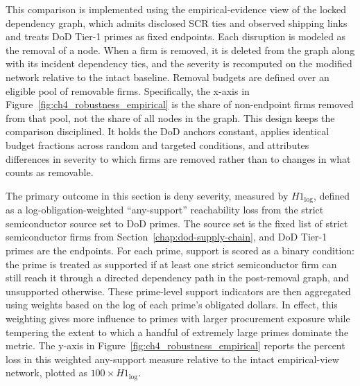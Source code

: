 This comparison is implemented using the empirical-evidence view of the locked dependency graph, which admits disclosed SCR ties and observed shipping links and treats DoD Tier-1 primes as fixed endpoints. Each disruption is modeled as the removal of a node. When a firm is removed, it is deleted from the graph along with its incident dependency ties, and the severity is recomputed on the modified network relative to the intact baseline. Removal budgets are defined over an eligible pool of removable firms. Specifically, the x-axis in Figure~\ref{fig:ch4_robustness_empirical} is the share of non-endpoint firms removed from that pool, not the share of all nodes in the graph. This design keeps the comparison disciplined. It holds the DoD anchors constant, applies identical budget fractions across random and targeted conditions, and attributes differences in severity to which firms are removed rather than to changes in what counts as removable.

The primary outcome in this section is deny severity, measured by $H1_{\log}$, defined as a log-obligation-weighted ``any-support'' reachability loss from the strict semiconductor source set to DoD primes. The source set is the fixed list of strict semiconductor firms from Section~\ref{chap:dod-supply-chain}, and DoD Tier-1 primes are the endpoints. For each prime, support is scored as a binary condition: the prime is treated as supported if at least one strict semiconductor firm can still reach it through a directed dependency path in the post-removal graph, and unsupported otherwise. These prime-level support indicators are then aggregated using weights based on the log of each prime's obligated dollars. In effect, this weighting gives more influence to primes with larger procurement exposure while tempering the extent to which a handful of extremely large primes dominate the metric. The y-axis in Figure~\ref{fig:ch4_robustness_empirical} reports the percent loss in this weighted any-support measure relative to the intact empirical-view network, plotted as $100\times H1_{\log}$.

